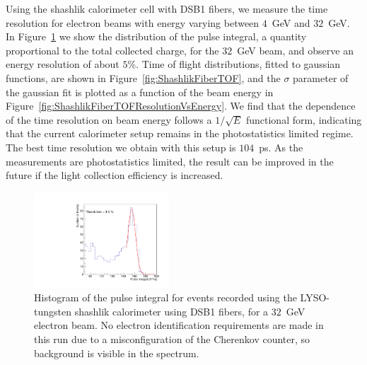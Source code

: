 \documentclass[12pt]{article}
\begin{document}
Using the shashlik calorimeter cell with DSB1 fibers, we measure the time resolution
for electron beams with energy varying between $4$~GeV and $32$~GeV.
In Figure~\ref{fig:ShashlikFiberEnergy32GeV} we show the distribution
of the pulse integral, a quantity proportional to the total collected charge,
for the $32$~GeV beam, and observe an energy resolution of about $5\%$.
Time of flight distributions, fitted to gaussian functions,
are shown in Figure~\ref{fig:ShashlikFiberTOF}, and the 
$\sigma$ parameter of the gaussian fit is plotted as a function of the
beam energy in Figure~\ref{fig:ShashlikFiberTOFResolutionVsEnergy}.
We find that the dependence of the time resolution on
beam energy follows a $1/\sqrt{E}$ functional form, indicating
that the current calorimeter setup remains in the photostatistics
limited regime. The best time resolution we obtain
with this setup is $104$~ps. As the measurements are photostatistics
limited, the result can be improved in the future if the light collection
efficiency is increased.

\begin{figure}[H] \centering
\includegraphics[width=0.45\textwidth]{figs/TOF_ShashlikDSB1Fiber_Electron_32GeV_energy} 
\caption{ Histogram of the pulse integral for events recorded using
the LYSO-tungsten shashlik calorimeter using DSB1 fibers, for 
a $32$~GeV electron beam. No electron identification requirements
are made in this run due to a misconfiguration of the Cherenkov counter,
so background is visible in the spectrum. } 
\label{fig:ShashlikFiberEnergy32GeV}
\end{figure}
\end{document}
